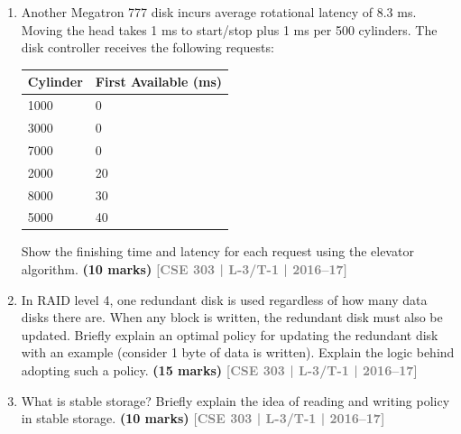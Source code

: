\documentclass[12pt]{article}
\newcommand{\yr}[1]{\hfill\textcolor{gray}{\small\textbf{[#1]}}}
\newcommand{\mk}[1]{\textcolor{orange!70!black}{\small\textbf{(#1 marks)}}}
\begin{document}
\begin{enumerate}
\item Another Megatron 777 disk incurs average rotational latency of 8.3 ms. Moving the head takes 1 ms to start/stop plus 1 ms per 500 cylinders. The disk controller receives the following requests:
\medskip
\begin{center}
\begin{tabular}{ll}
\toprule
\textbf{Cylinder} & \textbf{First Available (ms)}\\
\midrule
1000 & 0\\
3000 & 0\\
7000 & 0\\
2000 & 20\\
8000 & 30\\
5000 & 40\\
\bottomrule
\end{tabular}
\end{center}
Show the finishing time and latency for each request using the elevator algorithm.
\mk{10} \yr{CSE 303 | L-3/T-1 | 2016--17}


\item In RAID level 4, one redundant disk is used regardless of how many data disks there are. When any block is written, the redundant disk must also be updated. Briefly explain an optimal policy for updating the redundant disk with an example (consider 1 byte of data is written). Explain the logic behind adopting such a policy.
\mk{15} \yr{CSE 303 | L-3/T-1 | 2016--17}


\item What is stable storage? Briefly explain the idea of reading and writing policy in stable storage.
\mk{10} \yr{CSE 303 | L-3/T-1 | 2016--17}




\end{enumerate}
\end{document}
